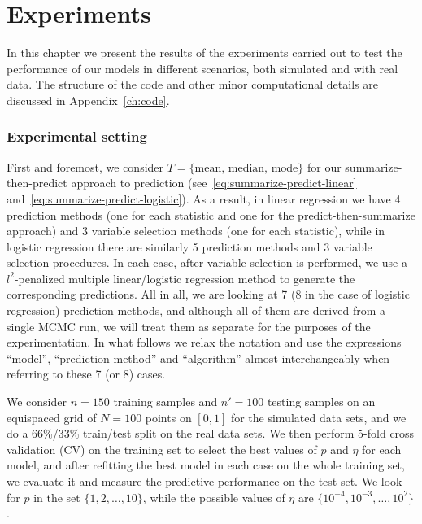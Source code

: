 %
%

\let\epsilon\varepsilon

\chapter{Experiments}\label{ch:experiments}

In this chapter we present the results of the experiments carried out to test the performance of our models in different scenarios, both simulated and with real data. The structure of the code and other minor computational details are discussed in Appendix~\ref{ch:code}.

\subsection*{Experimental setting}

First and foremost, we consider \(T=\{\text{mean, median, mode}\}\) for our summarize-then-predict approach to prediction (see~\eqref{eq:summarize-predict-linear} and~\eqref{eq:summarize-predict-logistic}). As a result, in linear regression we have 4 prediction methods (one for each statistic and one for the predict-then-summarize approach) and 3 variable selection methods (one for each statistic), while in logistic regression there are similarly 5 prediction methods and 3 variable selection procedures. In each case, after variable selection is performed, we use a \(l^2\)-penalized multiple linear/logistic regression method to generate the corresponding predictions. All in all, we are looking at 7 (8 in the case of logistic regression) prediction methods, and although all of them are derived from a single MCMC run, we will treat them as separate for the purposes of the experimentation. In what follows we relax the notation and use the expressions ``model'', ``prediction method'' and ``algorithm'' almost interchangeably when referring to these 7 (or 8) cases.

We consider \(n=150\) training samples and \(n'=100\) testing samples on an equispaced grid of \(N=100\) points on \([0, 1]\) for the simulated data sets, and we do a 66\%/33\% train/test split on the real data sets. We then perform \(5\)-fold cross validation (CV) on the training set to select the best values of \(p\) and \(\eta\) for each model, and after refitting the best model in each case on the whole training set, we evaluate it and measure the predictive performance on the test set. We look for \(p\) in the set \(\{1,2,\dots,10\}\), while the possible values of \(\eta\) are \(\{10^{-4}, 10^{-3}, \dots, 10^2\}\).

